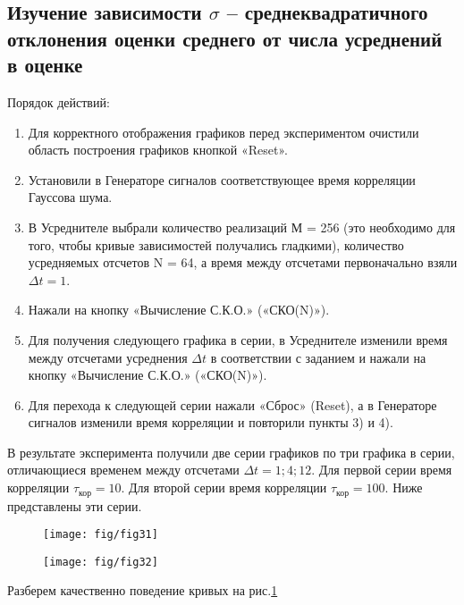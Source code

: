 \documentclass[a4paper,14pt]{extarticle}
\begin{document}
\subsection[Задание 3]{Изучение зависимости $\sigma$ -- среднеквадратичного отклонения оценки среднего от числа усреднений в оценке}
Порядок действий:
\begin{enumerate}
	\item Для корректного отображения графиков перед экспериментом очистили область построения графиков кнопкой «Reset».
	\item Установили в Генераторе сигналов соответствующее время корреляции Гауссова шума.
	\item В Усреднителе выбрали количество реализаций М = 256 (это необходимо для того, чтобы кривые зависимостей получались гладкими), количество усредняемых отсчетов N = 64, а время между отсчетами первоначально взяли $\Delta t = 1$.
	\item Нажали на кнопку «Вычисление С.К.О.» («СКО(N)»).
	\item Для получения следующего графика в серии, в Усреднителе изменили время между отсчетами усреднения $\Delta t$ в
	соответствии с заданием и нажали на кнопку «Вычисление С.К.О.» («СКО(N)»).
	\item Для перехода к следующей серии нажали «Сброс» (Reset), а в Генераторе сигналов изменили время корреляции и повторили пункты 3) и 4).
\end{enumerate}
В результате эксперимента получили две серии графиков по три графика в серии, отличающиеся временем между отсчетами $\Delta t=1; 4; 12$.
Для первой серии время корреляции $\tau_\text{кор} = 10$. Для второй серии время корреляции $\tau_\text{кор} = 100$.
Ниже представлены эти серии.
\begin{figure}[H]
    \begin{minipage}{0.49\linewidth}
        \centering
        \texttt{[image: fig/fig31]}
        \caption*{$\tau_\text{кор} = 10$}
    \end{minipage}
    \begin{minipage}{.49\linewidth}
        \centering
        \texttt{[image: fig/fig32]}
        \caption*{$\tau_\text{кор} = 100$}
    \end{minipage}
	\caption{}
	\label{fig:3}
\end{figure}
Разберем качественно поведение кривых на рис.\ref{fig:3} 
\end{document}
